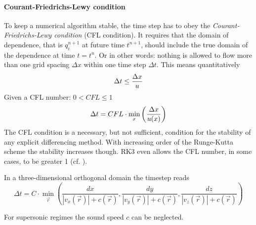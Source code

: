 \paragraph{Courant-Friedrichs-Lewy condition}
To keep a numerical algorithm stable, the time step has to obey the
\emph{Courant-Friedrichs-Lewy condition} (CFL condition). It requires that the
domain of dependence, that is $q_i^{n+1}$ at future time $t^{n+1}$, should
include the true domain of the dependence at time $t = t^n$. Or in other words:
nothing is allowed to flow more than one grid spacing $\Delta x$ within one
time step $\Delta t$.
This means quantitatively
\begin{equation}
    \Delta t \le \frac{\Delta x}{u}
\end{equation}
Given a CFL number: $0 < CFL \le 1$
\begin{equation}
    \Delta t = CFL \cdot \min_{x}\left(\frac{\Delta x}{u(x)}\right)
\end{equation}
The CFL condition is a necessary, but not sufficient, condition for the
stability of any explicit differencing method. With increasing order of the
Runge-Kutta scheme the stability increases though. RK3 even allows the CFL
number, in some cases, to be greater 1 (cf. \cite{jameson1981numerical}).

In a three-dimensional orthogonal domain the timestep reads
\begin{equation}
    \Delta t = C \cdot \min_{\vec{r}}\left(
        \frac{dx}{|v_x(\vec{r})|+c(\vec{r})},
        \frac{dy}{|v_y(\vec{r})|+c(\vec{r})},
        \frac{dz}{|v_z(\vec{r})|+c(\vec{r})}\right)
\end{equation}

For supersonic regimes the sound speed $c$ can be neglected.
